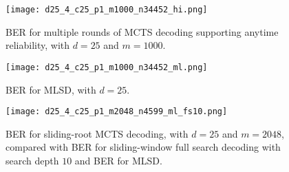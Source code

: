 \documentclass[conference,letterpaper]{IEEEtran}
\begin{document}
\begin{figure}[h]
	\centering
	\texttt{[image: d25\_4\_c25\_p1\_m1000\_n34452\_hi.png]}
	\caption{BER for multiple rounds of MCTS decoding supporting anytime reliability, with $d=25$ and $m=1000$.}
	\label{fig:d25_4_c25_p1_m1000_n10451_hi_ber}
\end{figure}

\begin{figure}[h]
	\centering
	\texttt{[image: d25\_4\_c25\_p1\_m1000\_n34452\_ml.png]}
	\caption{BER for MLSD, with $d=25$.}
	\label{fig:d25_4_c25_p1_m1000_n10451_ml_ber}
\end{figure}

\begin{figure}[h]
	\centering
	\texttt{[image: d25\_4\_c25\_p1\_m2048\_n4599\_ml\_fs10.png]}
	\caption{BER for sliding-root MCTS decoding, with $d=25$ and $m=2048$, compared with BER for sliding-window full search decoding with search depth $10$ and BER for MLSD.}
	\label{fig:d25_4_c25_p1_m2048_n4599_ml_fs10}
\end{figure}





	
	
\end{document}
